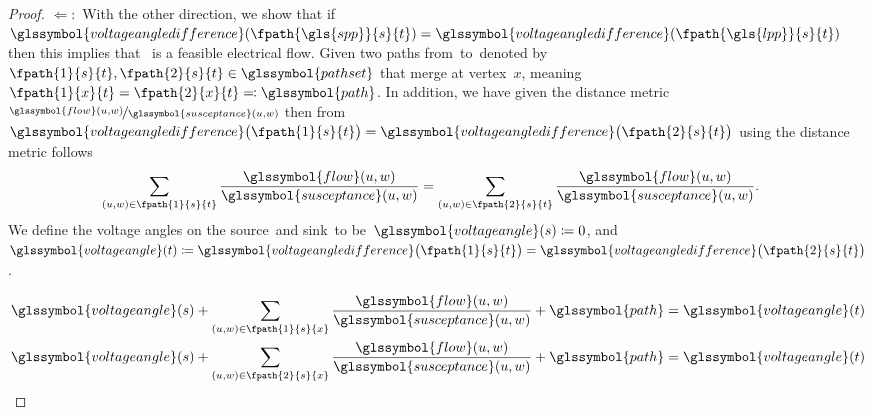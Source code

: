 \begin{proof}
    $\Leftarrow\colon$
    With the other direction, we show that if~$
        \glssymbol{voltageangledifference}(\fpath{\gls{spp}}{\source}{\sink})
        =
        \glssymbol{voltageangledifference}(\fpath{\gls{lpp}}{\source}{\sink})
    $ then this implies that~ is a feasible electrical flow.
    Given two paths from~\source to~\sink denoted by~$
        \fpath{1}{\source}{\sink},
        \fpath{2}{\source}{\sink}
        \in
        \glssymbol{pathset}
    $ that merge at vertex~$x$, meaning~$
        \fpath{1}{x}{\sink} 
        = 
        \fpath{2}{x}{\sink} 
        \eqqcolon 
        \glssymbol{path}
    $. In addition, we have given the distance metric~$
        \nicefrac{
            \glssymbol{flow}(\vertexa,\vertexc)
        }{
            \glssymbol{susceptance}(\vertexa,\vertexc)
        }
    $ then from~$
        \glssymbol{voltageangledifference}\big(\fpath{1}{\source}{\sink}\big)
        =
        \glssymbol{voltageangledifference}\big(\fpath{2}{\source}{\sink}\big)
    $ using the distance metric follows 
    \begin{align*}
        \sum_{(\vertexa,\vertexc)\in\fpath{1}{\source}{\sink}}
        \frac{
            \glssymbol{flow}(\vertexa,\vertexc)
        }{
            \glssymbol{susceptance}(\vertexa,\vertexc)
        }
        &=
        \sum_{(\vertexa,\vertexc)\in\fpath{2}{\source}{\sink}}
        \frac{
            \glssymbol{flow}(\vertexa,\vertexc)
        }{
            \glssymbol{susceptance}(\vertexa,\vertexc)
        }.
    \end{align*}
    We define the voltage angles on the source~\source and sink~\sink to
    be~$\glssymbol{voltageangle} (\source)\coloneqq 0$, and~$
        \glssymbol{voltageangle}(\sink)
        \coloneqq 
        \glssymbol{voltageangledifference}
        \big(
            \fpath{1}{\source}{\sink}
        \big)
        =
        \glssymbol{voltageangledifference}
        \big(
            \fpath{2}{\source}{\sink}
        \big)
    $. 

    \begin{align*}
        \glssymbol{voltageangle}(\source) 
        + 
        \sum_{ (\vertexa,\vertexc) \in \fpath{1}{\source}{x} }
        \frac{
            \glssymbol{flow}(\vertexa,\vertexc)
        }{
            \glssymbol{susceptance}(\vertexa,\vertexc)
        }
        +
        \glssymbol{path}
        =
        \glssymbol{voltageangle}(\sink)
        \\
        \glssymbol{voltageangle}(\source) 
        + 
        \sum_{ (\vertexa,\vertexc) \in \fpath{2}{\source}{x} }
        \frac{
            \glssymbol{flow}(\vertexa,\vertexc)
        }{
            \glssymbol{susceptance}(\vertexa,\vertexc)
        }
        +
        \glssymbol{path}
        =
        \glssymbol{voltageangle}(\sink)
    \end{align*}


\end{proof}
